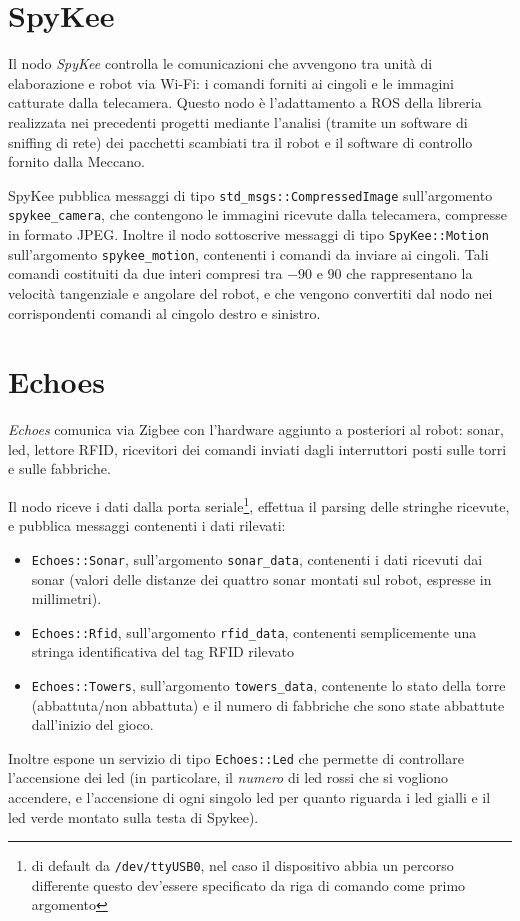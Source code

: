 
\section{SpyKee}
Il nodo \emph{SpyKee} controlla le comunicazioni che avvengono tra unità di elaborazione e robot via Wi-Fi: i comandi forniti ai cingoli e le immagini catturate dalla telecamera. Questo nodo è l'adattamento a ROS della libreria realizzata nei precedenti progetti mediante l'analisi (tramite un software di sniffing di rete) dei pacchetti scambiati tra il robot e il software di controllo fornito dalla Meccano.

SpyKee pubblica messaggi di tipo \verb|std_msgs::CompressedImage| sull'argomento \verb|spykee_camera|, che contengono le immagini ricevute dalla telecamera, compresse in formato JPEG. Inoltre il nodo sottoscrive messaggi di tipo \verb|SpyKee::Motion| sull'argomento \verb|spykee_motion|, contenenti i comandi da inviare ai cingoli. Tali comandi costituiti da due interi compresi tra $-90$ e $90$ che rappresentano la velocità tangenziale e angolare del robot, e che vengono convertiti dal nodo nei corrispondenti comandi al cingolo destro e sinistro.

\section{Echoes}
\emph{Echoes} comunica via Zigbee con l'hardware aggiunto a posteriori al robot: sonar, led, lettore RFID, ricevitori dei comandi inviati dagli interruttori posti sulle torri e sulle fabbriche.

Il nodo riceve i dati dalla porta seriale\footnote{di default da \texttt{/dev/ttyUSB0}, nel caso il dispositivo abbia un percorso differente questo dev'essere specificato da riga di comando come primo argomento}, effettua il parsing delle stringhe ricevute, e pubblica messaggi contenenti i dati rilevati:
\begin{itemize}
	\item \verb|Echoes::Sonar|, sull'argomento \verb|sonar_data|, contenenti i dati ricevuti dai sonar (valori delle distanze dei quattro sonar montati sul robot, espresse in millimetri). 
	\item \verb|Echoes::Rfid|, sull'argomento \verb|rfid_data|, contenenti semplicemente una stringa identificativa del tag RFID rilevato
	\item \verb|Echoes::Towers|, sull'argomento \verb|towers_data|, contenente lo stato della torre (abbattuta/non abbattuta) e il numero di fabbriche che sono state abbattute dall'inizio del gioco. %
\end{itemize}
Inoltre espone un servizio di tipo \verb|Echoes::Led| che permette di controllare l'accensione dei led (in particolare, il \emph{numero} di led rossi che si vogliono accendere, e l'accensione di ogni singolo led per quanto riguarda i led gialli e il led verde montato sulla testa di Spykee). %

